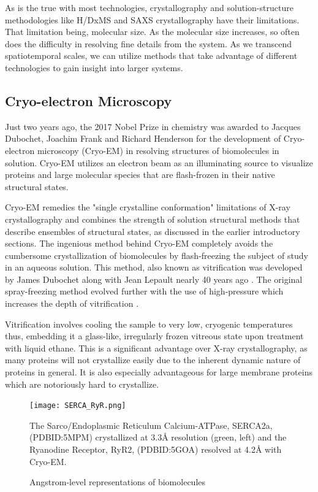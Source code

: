 \documentclass[12pt]{ucsddissertation}
\begin{document}
\begin{dissertationintroduction}
 As is the true with most technologies, crystallography and solution-structure methodologies like H/DxMS and SAXS crystallography have their limitations. That limitation being, molecular size. As the molecular size increases, so often does the difficulty in resolving fine details from the system. As we transcend spatiotemporal scales, we can utilize methods that take advantage of different technologies to gain insight into larger systems. 
 
\subsection{Cryo-electron Microscopy}

Just two years ago, the 2017 Nobel Prize in chemistry was awarded to Jacques Dubochet, Joachim Frank and Richard Henderson for the development of Cryo-electron microscopy (Cryo-EM) in resolving structures of biomolecules in solution. Cryo-EM utilizes an electron beam as an illuminating source to visualize proteins and large molecular species that are flash-frozen in their native structural states. 

Cryo-EM remedies the "single crystalline conformation" limitations of X-ray crystallography and combines the strength of solution structural methods that describe ensembles of structural states, as discussed in the earlier introductory sections. The ingenious method behind Cryo-EM completely avoids the cumbersome crystallization of biomolecules by flash-freezing the subject of study in an aqueous solution. This method, also known as vitrification was developed by James Dubochet along with Jean Lepault nearly 40 years ago \cite{Dubochet1982,Lepault1983,Lepault1986}. The original spray-freezing method evolved further with the use of high-pressure which increases the depth of vitrification \cite{SARTORI1993}. 

Vitrification involves cooling the sample to very low, cryogenic temperatures thus, embedding it a glass-like, irregularly frozen vitreous state upon treatment with liquid ethane. This is a significant advantage over X-ray crystallography, as many proteins will not crystallize easily due to the inherent dynamic nature of proteins in general. It is also especially advantageous for large membrane proteins which are notoriously hard to crystallize.

\setcounter{figure}{3}
\begin{figure}
\centerline{\texttt{[image: SERCA\_RyR.png]}}
	\caption{Angstrom-level representations of biomolecules} The Sarco/Endoplasmic Reticulum Calcium-ATPase, SERCA2a, (PDBID:5MPM) crystallized at 3.3\si{\angstrom} resolution (green, left) and the Ryanodine Receptor, RyR2, (PDBID:5GOA) resolved at 4.2\si{\angstrom} with Cryo-EM. 
\end{figure}


\end{dissertationintroduction}
\end{document}
